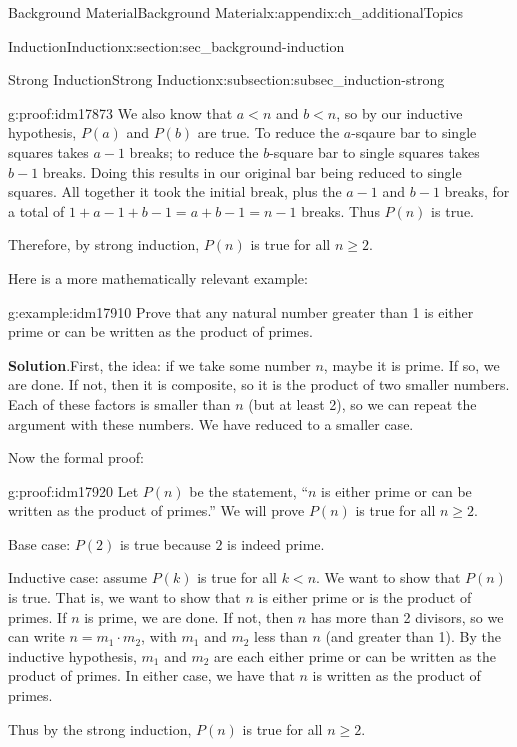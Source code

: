 \documentclass[oneside,10pt,]{book}
\numberwithin{equation}{chapter}
\newcommand{\lt}{<}
\begin{document}
\begin{appendixptx}{Background Material}{}{Background Material}{}{}{x:appendix:ch_additionalTopics}
\begin{sectionptx}{Induction}{}{Induction}{}{}{x:section:sec_background-induction}
\begin{subsectionptx}{Strong Induction}{}{Strong Induction}{}{}{x:subsection:subsec_induction-strong}
\begin{proofptx}{}{g:proof:idm17873}
We also know that \(a \lt n\) and \(b \lt n\), so by our inductive hypothesis, \(P(a)\) and \(P(b)\) are true.  To reduce the \(a\)-sqaure bar to single squares takes \(a-1\) breaks; to reduce the \(b\)-square bar to single squares takes \(b-1\) breaks.  Doing this results in our original bar being reduced to single squares.  All together it took the initial break, plus the \(a-1\) and \(b-1\) breaks, for a total of \(1+a-1+b-1 = a+b-1 = n-1\) breaks.  Thus \(P(n)\) is true.%
\par
Therefore, by strong induction, \(P(n)\) is true for all \(n \ge 2\).%
\end{proofptx}
Here is a more mathematically relevant example:%
\begin{example}{}{g:example:idm17910}%
Prove that any natural number greater than 1 is either prime or can be written as the product of primes.%
\par\smallskip%
\noindent\textbf{Solution}.\hypertarget{g:solution:idm17915}{}\quad{}First, the idea: if we take some number \(n\), maybe it is prime. If so, we are done. If not, then it is composite, so it is the product of two smaller numbers. Each of these factors is smaller than \(n\) (but at least 2), so we can repeat the argument with these numbers. We have reduced to a smaller case.%
\par
Now the formal proof:%
\begin{proofptx}{}{g:proof:idm17920}
Let \(P(n)\) be the statement, ``\(n\) is either prime or can be written as the product of primes.'' We will prove \(P(n)\) is true for all \(n \ge 2\).%
\par
Base case: \(P(2)\) is true because \(2\) is indeed prime.%
\par
Inductive case: assume \(P(k)\) is true for all \(k \lt  n\). We want to show that \(P(n)\) is true. That is, we want to show that \(n\) is either prime or is the product of primes. If \(n\) is prime, we are done. If not, then \(n\) has more than 2 divisors, so we can write \(n = m_1 \cdot m_2\), with \(m_1\) and \(m_2\) less than \(n\) (and greater than 1). By the inductive hypothesis, \(m_1\) and \(m_2\) are each either prime or can be written as the product of primes. In either case, we have that \(n\) is written as the product of primes.%
\par
Thus by the strong induction, \(P(n)\) is true for all \(n \ge 2\).%
\end{proofptx}
\end{example}

\end{subsectionptx}
\end{sectionptx}
\end{appendixptx}
\end{document}
